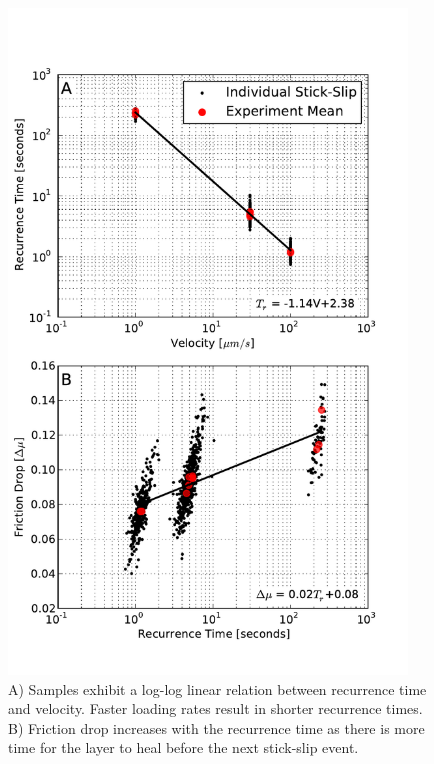 \begin{figure}
\includegraphics[width=25pc]{chap_electrical/ss_props.pdf}
\caption{A) Samples exhibit a log-log linear relation between recurrence time and velocity.  Faster loading rates result in shorter recurrence times. B) Friction drop increases with the recurrence time as there is more time for the layer to heal before the next stick-slip event.}
\label{ss_props}
\end{figure}

\clearpage

